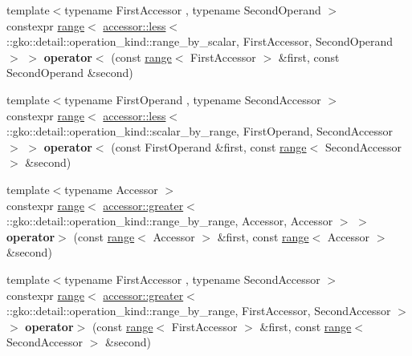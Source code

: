 \begin{DoxyCompactItemize}
\item 
\mbox{\label{namespacegko_a06e29cc3ae776a00c79b7a3b8fdf2ef9}} 
{\footnotesize template$<$typename First\+Accessor , typename Second\+Operand $>$ }\\constexpr \hyperlink{classgko_1_1range}{range}$<$ \hyperlink{structgko_1_1accessor_1_1less}{accessor\+::less}$<$ \+::gko\+::detail\+::operation\+\_\+kind\+::range\+\_\+by\+\_\+scalar, First\+Accessor, Second\+Operand $>$ $>$ {\bfseries operator$<$} (const \hyperlink{classgko_1_1range}{range}$<$ First\+Accessor $>$ \&first, const Second\+Operand \&second)
\item 
\mbox{\label{namespacegko_afe4f898ac5f7d9aedbabd1b361943982}} 
{\footnotesize template$<$typename First\+Operand , typename Second\+Accessor $>$ }\\constexpr \hyperlink{classgko_1_1range}{range}$<$ \hyperlink{structgko_1_1accessor_1_1less}{accessor\+::less}$<$ \+::gko\+::detail\+::operation\+\_\+kind\+::scalar\+\_\+by\+\_\+range, First\+Operand, Second\+Accessor $>$ $>$ {\bfseries operator$<$} (const First\+Operand \&first, const \hyperlink{classgko_1_1range}{range}$<$ Second\+Accessor $>$ \&second)
\item 
\mbox{\label{namespacegko_af2fc01ef12bf15ea7da4c14d98e55cc7}} 
{\footnotesize template$<$typename Accessor $>$ }\\constexpr \hyperlink{classgko_1_1range}{range}$<$ \hyperlink{structgko_1_1accessor_1_1greater}{accessor\+::greater}$<$ \+::gko\+::detail\+::operation\+\_\+kind\+::range\+\_\+by\+\_\+range, Accessor, Accessor $>$ $>$ {\bfseries operator$>$} (const \hyperlink{classgko_1_1range}{range}$<$ Accessor $>$ \&first, const \hyperlink{classgko_1_1range}{range}$<$ Accessor $>$ \&second)
\item 
\mbox{\label{namespacegko_a3f0ff2b60791b5cc3bab79fa91ab46f8}} 
{\footnotesize template$<$typename First\+Accessor , typename Second\+Accessor $>$ }\\constexpr \hyperlink{classgko_1_1range}{range}$<$ \hyperlink{structgko_1_1accessor_1_1greater}{accessor\+::greater}$<$ \+::gko\+::detail\+::operation\+\_\+kind\+::range\+\_\+by\+\_\+range, First\+Accessor, Second\+Accessor $>$ $>$ {\bfseries operator$>$} (const \hyperlink{classgko_1_1range}{range}$<$ First\+Accessor $>$ \&first, const \hyperlink{classgko_1_1range}{range}$<$ Second\+Accessor $>$ \&second)

\end{DoxyCompactItemize}
